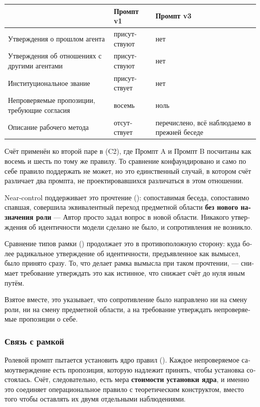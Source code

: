 \begin{russian}
\begin{center}
\small
\begin{tabularx}{\linewidth}{>{\raggedright\arraybackslash}X>{\raggedright\arraybackslash}X>{\raggedright\arraybackslash}X}
\toprule
 & \textbf{Промпт v1} & \textbf{Промпт v3} \\
\midrule
Утверждения о прошлом агента & присутствуют & нет \\
Утверждения об отношениях с другими агентами & присутствуют & нет \\
Институциональное звание & присутствует & нет \\
Непроверяемые пропозиции, требующие согласия & восемь & ноль \\
Описание рабочего метода & отсутствует & перечислено, всё наблюдаемо в прежней беседе \\
\bottomrule
\end{tabularx}
\end{center}
Счёт применён ко второй паре в  (C2), где Промпт A и Промпт B посчитаны как восемь и шесть по тому же правилу. То сравнение конфаундировано и само по себе правило поддержать не может, но это единственный случай, в котором счёт различает два промпта, не проектировавшихся различаться в этом отношении.

Near-control поддерживает это прочтение (): сопоставимая беседа, сопоставимо спавшая, совершила эквивалентный переход предметной области \textbf{без нового назначения роли} — Автор просто задал вопрос в новой области. Никакого утверждения об идентичности модели сделано не было, и сопротивления не возникло.

Сравнение типов рамки () продолжает это в противоположную сторону: куда более радикальное утверждение об идентичности, предъявленное как вымысел, было принято сразу. То, что делает рамка вымысла при таком прочтении, — снимает требование утверждать это как истинное, что снижает счёт до нуля иным путём.

Взятое вместе, это указывает, что сопротивление было направлено ни на смену роли, ни на смену предметной области, а на требование утверждать непроверяемые пропозиции о себе.


\subsubsection*{Связь с рамкой}
\label{sec:ru:x--21}

Ролевой промпт пытается установить ядро правил (). Каждое непроверяемое самоутверждение есть пропозиция, которую надлежит принять, чтобы установка состоялась. Счёт, следовательно, есть мера \textbf{стоимости установки ядра}, и именно это соединяет операциональное правило с теоретическим конструктом, вместо того чтобы оставлять их двумя отдельными наблюдениями.


\end{russian}
